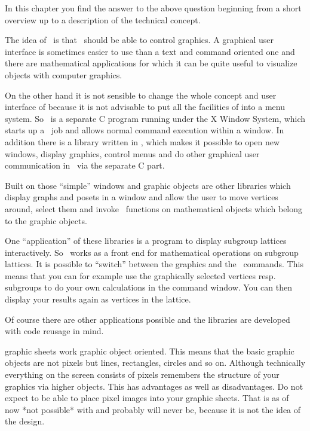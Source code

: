 
In this chapter you find the answer to the above question beginning from a
short overview up to a description of the technical concept.


The idea of \XGAP~is that \GAP~should be able to control graphics. A
graphical user interface is sometimes easier to use than a text and
command oriented one and there are mathematical applications for which it
can be quite useful to visualize objects with computer graphics.

On the other hand it is not sensible to change the whole concept and user
interface of {\GAP} because it is not advisable to put all the facilities of
{\GAP} into a menu system. So \XGAP~is a separate C program running under the
X Window System, which starts up a \GAP~job and allows normal command
execution within a window. In addition there is a library written in \GAP,
which makes it possible to open new windows, display graphics, control menus
and do other graphical user communication in \GAP~via the separate C part.

Built on those ``simple'' windows and graphic objects are other libraries
which display graphs and posets in a window and allow the user to move
vertices around, select them and invoke \GAP~functions on mathematical
objects which belong to the graphic objects.

One ``application'' of these libraries is a program to display subgroup
lattices interactively. So \XGAP~works as a front end for mathematical
operations on subgroup lattices. It is possible to ``switch'' between the
graphics and the \GAP~commands. This means that you can for example use the 
graphically selected vertices resp. subgroups to do your own calculations
in the command window. You can then display your results again as vertices
in the lattice.

Of course there are other applications possible and the libraries are
developed with code reusage in mind.


{\XGAP} graphic sheets work graphic object oriented. This means that the
basic graphic objects are not pixels but lines, rectangles, circles and so
on. Although technically everything on the screen consists of pixels
{\XGAP} remembers the structure of your graphics via higher objects. This
has advantages as well as disadvantages. Do not expect to be able to
place pixel images into your {\XGAP} graphic sheets. That is as of now
*not possible* with {\XGAP} and probably will never be, because it is not
the idea of the design. 


